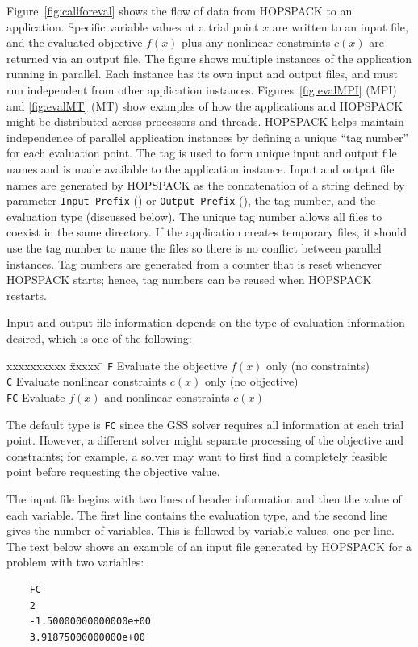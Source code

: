 Figure~\ref{fig:callforeval} shows the flow of data from HOPSPACK to an
application.  Specific variable values at a trial point $x$ are written
to an input file, and the evaluated objective $f(x)$ plus any
nonlinear constraints $c(x)$ are returned via an output file.
%
The figure shows multiple instances of the application running in parallel.
Each instance has its own input and output files, and must run independent
from other application instances.
Figures~\ref{fig:evalMPI} (MPI) and \ref{fig:evalMT} (MT) show examples of how
the applications and HOPSPACK might be distributed across processors and threads.
HOPSPACK helps maintain independence of parallel application instances
by defining a unique ``tag number'' for each evaluation point.  The tag is
used to form unique input and output file names and is made available to
the application instance.  Input and output file names are generated by
HOPSPACK as the concatenation of a string
defined by parameter {\tt Input Prefix} ()
or {\tt Output Prefix} (), the tag number, and
the evaluation type (discussed below).
The unique tag number allows all files to coexist in the same directory.
If the application creates temporary files, it should use the tag number
to name the files so there is no conflict between parallel instances.
Tag numbers are generated from a counter that is reset whenever HOPSPACK starts;
hence, tag numbers can be reused when HOPSPACK restarts.
 
Input and output file information depends on the type of evaluation information
desired, which is one of the following:
\vspace{-11pt}
\begin{tabbing}
  xxxxxxxxxx \= xxxxx \= \kill
  \> {\tt F}  \> Evaluate the objective $f(x)$ only (no constraints)  \\
  \> {\tt C}  \> Evaluate nonlinear constraints $c(x)$ only (no objective)  \\
  \> {\tt FC} \> Evaluate $f(x)$ and nonlinear constraints $c(x)$
\end{tabbing}
The default type is {\tt FC} since the GSS solver requires all information
at each trial point.  However, a different solver might separate processing
of the objective and constraints; for example, a solver may want to first
find a completely feasible point before requesting the objective value.

The input file begins with two lines of header information and then the value
of each variable.  The first line contains the evaluation type,
and the second line gives the number of variables.
This is followed by variable values, one per line.
The text below shows an example of an input file generated by HOPSPACK for
a problem with two variables:
\vspace{-11pt}
\begin{verbatim}
    FC
    2
    -1.50000000000000e+00
    3.91875000000000e+00
\end{verbatim}

